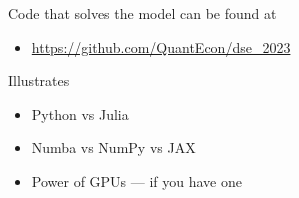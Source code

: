 \documentclass[xcolor=tex,dvipsnames]{beamer}
\begin{document}
\begin{frame}
    

    Code that solves the model can be found at

    \begin{itemize}
        \item \url{https://github.com/QuantEcon/dse_2023}
    \end{itemize}

    \vspace{0.5em}
    \vspace{0.5em}
    \vspace{0.5em}
    Illustrates

    \begin{itemize}
        \item Python vs Julia
        \vspace{0.5em}
        \item Numba vs NumPy vs JAX
        \vspace{0.5em}
        \item Power of GPUs --- if you have one
    \end{itemize}

\end{frame}
\end{document}
